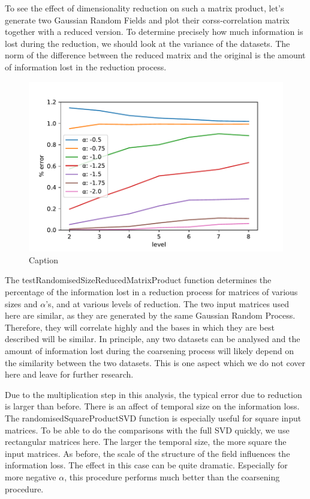 \documentclass{acm_proc_article-sp}
\begin{document}
To see the effect of dimensionality reduction on such a matrix product, let's generate two Gaussian Random Fields and plot their corss-correlation matrix together with a reduced version. To determine precisely how much information is lost during the reduction, we should look at the variance of the datasets. The norm of the difference between the reduced matrix and the original is the amount of information lost in the reduction process.


\begin{figure}[h]
\begin{center}
\includegraphics[scale=0.5]{Results/plotRandomisedSizeReducedMatrixProduct.pdf}
\caption[Small caption]{Caption}
\label{fig:plotRandomisedSizeReducedMatrixProduct}
\end{center}
\end{figure}

The testRandomisedSizeReducedMatrixProduct function determines the percentage of the information lost in a reduction process for matrices of various sizes and $\alpha$'s, and at various levels of reduction. The two input matrices used here are similar, as they are generated by the same Gaussian Random Process. Therefore, they will correlate highly and the bases in which they are best described will be similar. In principle, any two datasets can be analysed and the amount of information lost during the coarsening process will likely depend on the similarity between the two datasets. This is one aspect which we do not cover here and leave for further research.

Due to the multiplication step in this analysis, the typical error due to reduction is larger than before. There is an affect of temporal size on the information loss. The randomisedSquareProductSVD function is especially useful for square input matrices. To be able to do the comparisons with the full SVD quickly, we use rectangular matrices here. The larger the temporal size, the more square the input matrices. As before, the scale of the structure of the field influences the information loss. The effect in this case can be quite dramatic. Especially for more negative $\alpha$, this procedure performs much better than the coarsening procedure.
\end{document}
